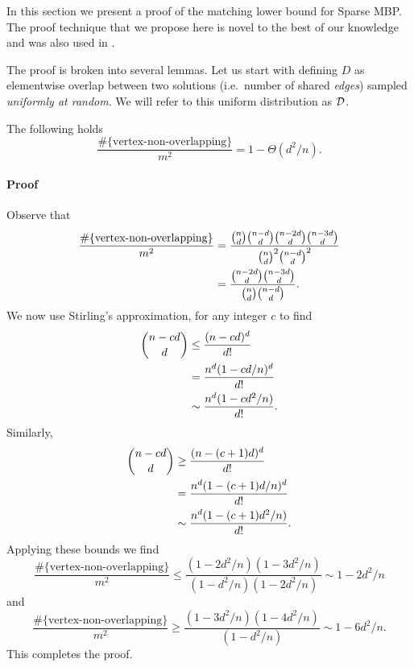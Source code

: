 In this section we present a proof of the matching lower bound for Sparse
MBP. The proof technique that we propose here is novel to the best of our
knowledge and was also used in \citep[see][]{magner2015protein,magner2016isit}.

The proof is broken into several lemmas. Let us start with defining $D$ as
elementwise overlap between two solutions (i.e.~number of shared \textit{edges})
sampled \textit{uniformly at random}. We will refer to this uniform distribution
as ${\cal D}$.
%
%

\begin{lemma}\label{lem:vertex_non_overlap}
The following holds
  \begin{equation}
    \frac{\#\{\text{vertex-non-overlapping}\}}{m^2} = 1 - \Theta(d^2/n).
  \end{equation}
\end{lemma}
\parsec
\paragraph{Proof}
Observe that
\begin{align}\label{eq:vertex_non_overlap}
  \frac{\#\{\text{vertex-non-overlapping}\}}{m^2} 
    &= \frac{\binom{n}{d} \binom{n-d}{d} \binom{n-2d}{d} \binom{n-3d}{d}}%
      {\binom{n}{d}^2 \binom{n-d}{d}^2} \notag \\
    &= \frac{\binom{n-2d}{d} \binom{n-3d}{d}}%
      {\binom{n}{d} \binom{n-d}{d}}.
\end{align}
We now use Stirling's approximation, for any integer $c$ to find
\begin{align}
  \binom{n - cd}{d} &\le \frac{(n - cd)^d}{d!} \notag \\
    &= \frac{n^d ( 1 - cd/n)^d}{d!} \notag \\
    &\sim \frac{n^d (1 - cd^2/n)}{d!}.
\end{align}
Similarly,
\begin{align}
  \binom{n - cd}{d} &\ge \frac{(n - (c+1)d)^d}{d!} \notag \\
    &= \frac{n^d ( 1 - (c+1)d/n)^d}{d!} \notag \\
    &\sim \frac{n^d (1 - (c+1)d^2/n)}{d!}.
\end{align}
Applying these bounds we find
\begin{equation}
  \frac{\#\{\text{vertex-non-overlapping}\}}{m^2} 
    \le \frac{(1 - 2d^2/n) (1 - 3d^2/n)}{(1 - d^2/n) (1 - 2d^2/n)}
    \sim 1 - 2d^2/n
\end{equation}
and
\begin{equation}
  \frac{\#\{\text{vertex-non-overlapping}\}}{m^2} 
    \ge \frac{(1 - 3d^2/n) (1 - 4d^2/n)}{(1 - d^2/n)}
    \sim 1 - 6d^2/n.
\end{equation}
This completes the proof.
\QEDA

